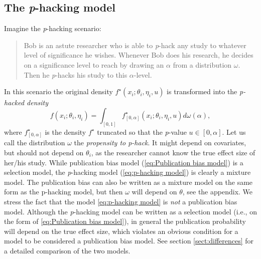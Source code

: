 \documentclass{article}
\theoremstyle{plain}
\theoremstyle{definition}
\begin{document}
\subsection{The \textit{p}-hacking model}\label{subsect:p-hacking}

Imagine the \textit{p}-hacking scenario:
\begin{quote}
Bob is an astute researcher who is able to \textit{p}-hack any study to whatever level of significance he wishes. Whenever Bob does his research, he decides on a significance level to reach by drawing an $\alpha$ from a distribution $\omega$. Then he \textit{p}-hacks his study to this $\alpha$-level.
\end{quote}
In this scenario the original density $f^{\star}\left(x_{i};\theta_{i},\eta_{i}, u\right)$
is transformed into the \emph{p-hacked density}
\begin{equation}\label{eq:p-hacking model}
f\left(x_{i};\theta_{i},\eta_{i}\right)=\int_{[0,1]}f_{\left[0,\alpha\right]}^{\star}\left(x_{i};\theta_{i},\eta_{i}, u\right)d\omega\left(\alpha\right),
\end{equation}
where $f_{\left[0,\alpha\right]}^{\star}$ is the density $f^{\star}$ truncated so that the \textit{p}-value $u\in\left[0,\alpha\right]$. Let us call the distribution $\omega$ the \emph{propensity to p-hack}. It might depend on covariates, but should not depend on $\theta_{i}$, as the researcher cannot know the true effect size of her/his study. While publication bias model (\ref{eq:Publication bias model}) is a selection model, the \textit{p}-hacking model (\ref{eq:p-hacking model}) is clearly a mixture model. The publication bias can also be written as a mixture model on the same form as the p-hacking model, but then $\omega$ will depend on $\theta$, see the appendix. We stress the fact that the model \eqref{eq:p-hacking model} is \emph{not} a publication bias model. Although the \textit{p}-hacking model can be written as a selection model (i.e., on the form of \eqref{eq:Publication bias model}), in general the publication probability will depend on the true effect size, which violates an obvious condition for a model to be considered a publication bias model. See section \ref{sect:differences} for a detailed comparison of the two models.
\end{document}
